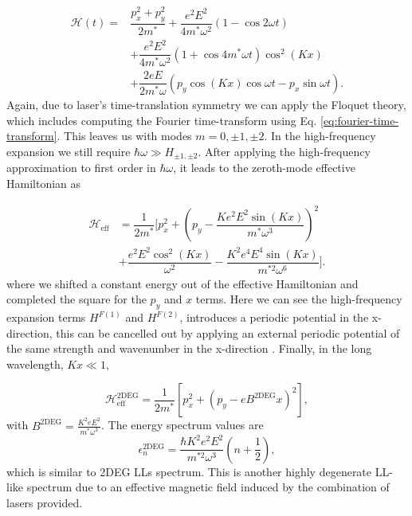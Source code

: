\documentclass[aps,prb,twocolumn,showpacs,superscriptaddress]{revtex4-2}
\newcommand{\ham}{\mathcal{H}}
\begin{document}
\begin{align}\label{eq:H2time}
  \ham(t) = &\dfrac{p_x^2 + p_y^2}{2m^*} + \dfrac{e^2 E^2}{4m^* \omega^2}(1-\cos{2\omega t}) \nonumber \\
  &+ \dfrac{e^2 E^2}{4m^*\omega^2}(1+\cos{4m^* \omega t}) \cos^2{(Kx)} \nonumber \\
  &+\dfrac{2eE}{2m^* \omega} \left(p_y \cos{(Kx)}\cos{\omega t} -  p_x \sin{\omega t}\right).
\end{align}
Again, due to laser's time-translation symmetry we can apply the Floquet theory, which includes computing the Fourier time-transform using Eq. \eqref{eq:fourier-time-transform}.
This leaves us with modes $m=0,\pm1,\pm2$.
In the high-frequency expansion we still require $\hbar \omega \gg H_{\pm1,\pm2}$.
After applying the high-frequency approximation to first order in $\hbar \omega$, it leads to the zeroth-mode effective Hamiltonian as

\begin{align}\label{eq:H2eff}
  \ham_{\text{eff}} &= \dfrac{1}{2m^*} \Biggl[ p_x^2 + \left(p_y - \dfrac{K e^2 E^2 \sin{(Kx)}}{m^*\omega^3} \right)^2 \nonumber \\
  &+ \dfrac{e^2 E^2 \cos^2{(Kx)}}{\omega^2}  - \dfrac{K^2 e^4 E^4 \sin{(Kx)}}{m^{*2}\omega^6} \Biggr]. \nonumber
\end{align}
where we shifted a constant energy out of the effective Hamiltonian and completed the square for the $p_y$ and $x$ terms.
Here we can see the high-frequency expansion terms $H^{F(1)}$ and $H^{F(2)}$, introduces a periodic potential in the x-direction, this can be cancelled out by applying an external periodic potential of the same strength and wavenumber in the x-direction \cite{supp}.
Finally, in the long wavelength, $Kx \ll 1$,

\begin{equation}\label{eq:Heff2deg}
  \ham_{\text{eff}}^{\text{2DEG}} = \dfrac{1}{2m^*} \left[ p_x^2 + {\left(p_y - eB^{\text{2DEG}}x \right)}^2  \right],
\end{equation}
with $B^{\text{2DEG}} = \tfrac{K^2 e E^2 }{m^*\omega^3}$.
The energy spectrum values are
\begin{equation}\label{eq:2DEGenergy}
  \epsilon_n^{\text{2DEG}} = \dfrac{\hbar K^2 e^2 E^2}{m^{*2}\omega^3} \left(n+\dfrac{1}{2}\right),
\end{equation}
which is similar to 2DEG LLs spectrum.
This is another highly degenerate LL-like spectrum due to an effective magnetic field induced by the combination of lasers provided.
\end{document}
